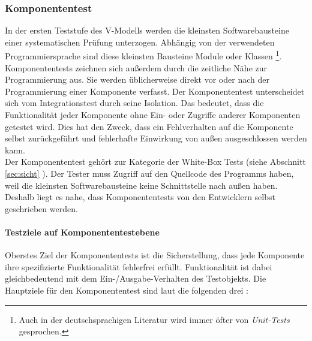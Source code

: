 \subsubsection{Komponententest}
\label{sec:unit_test}
In der ersten Teststufe des V-Modells werden die kleinsten Softwarebausteine einer systematischen Prüfung unterzogen. Abhängig von der verwendeten Programmiersprache sind diese kleinsten Bausteine Module oder Klassen \footnote{Auch in der deutschsprachigen Literatur wird immer öfter von \textit{Unit-Tests} gesprochen.}.\\
Komponententests zeichnen sich außerdem durch die zeitliche Nähe zur Programmierung aus. Sie werden üblicherweise direkt vor oder nach der Programmierung einer Komponente verfasst. Der Komponententest unterscheidet sich vom Integrationstest durch seine Isolation. Das bedeutet, dass die Funktionalität jeder Komponente ohne Ein- oder Zugriffe anderer Komponenten getestet wird. Dies hat den Zweck, dass ein Fehlverhalten auf die Komponente selbst zurückgeführt und fehlerhafte Einwirkung von außen ausgeschlossen werden kann.\\
Der Komponententest gehört zur Kategorie der White-Box Tests (siehe Abschnitt \ref{sec:sicht} ). Der Tester muss Zugriff auf den Quellcode des Programms haben, weil die kleinsten Softwarebausteine keine Schnittstelle nach außen haben. Deshalb liegt es nahe, dass Komponententests von den Entwicklern selbst geschrieben werden.

\paragraph{Testziele auf Komponententestebene}
Oberstes Ziel der Komponententests ist die Sicherstellung, dass jede Komponente ihre spezifizierte Funktionalität fehlerfrei erfüllt. Funktionalität ist dabei gleichbedeutend mit dem Ein-/Ausgabe-Verhalten des Testobjekts. Die Hauptziele für den Komponententest sind laut \citeauthor{spillner_basiswissen_2012} die folgenden drei \cite{spillner_basiswissen_2012}:

